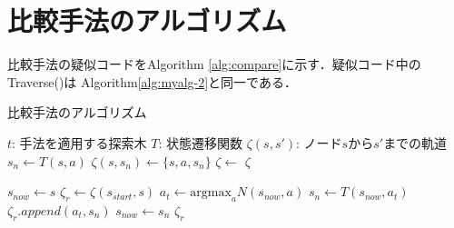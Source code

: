 \section{比較手法のアルゴリズム}
比較手法の疑似コードをAlgorithm \ref{alg:compare}に示す．疑似コード中のTraverse()は Algorithm\ref{alg:myalg-2}と同一である．
\begin{algorithm}
    \caption{比較手法のアルゴリズム}
    \label{alg:compare}
    \begin{algorithmic}[1]       
        \State $t$: 手法を適用する探索木
        \State $T$: 状態遷移関数
        \State $\zeta(s, s')$: ノード$s$から$s'$までの軌道
           \State $s_n \gets T(s, a)$
           \State $\zeta(s, s_n) \gets \{s, a, s_n\}$
           \State $\zeta \gets$ 
           \Return $\zeta$
        \EndFunction
        
            \State $s_{now} \gets s$
            \State $\zeta_r \gets \zeta(s_{start}, s)$
                \State $a_t \gets \textrm{argmax}_a N(s_{now}, a)$
                \State $s_n \gets T(s_{now}, a_t)$
                \State $\zeta_r.append({a_t, s_n})$
                \State $s_{now} \gets s_n$
            \EndWhile
            \Return $\zeta_r$
        \EndFunction
       
        
    \end{algorithmic}
\end{algorithm}



